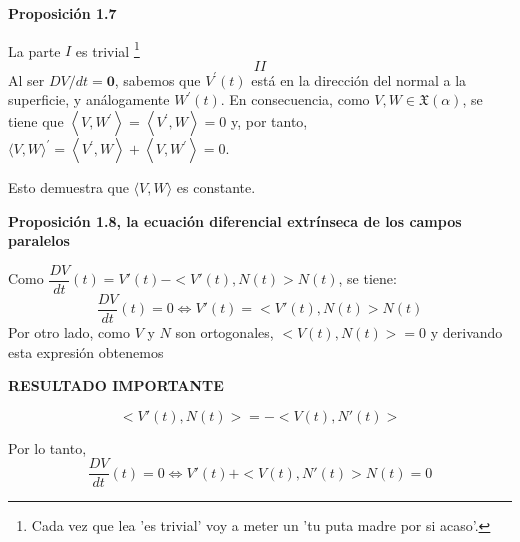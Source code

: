 \documentclass[openany]{book}
\begin{document}
\begin{center}
\textbf{Proposición 1.7}
\end{center}
\begin{demonstration}
  La parte $I$ es trivial \footnote{Cada vez que lea 'es trivial' voy a meter un 'tu puta madre por si acaso'.}
    $$ II $$
  Al ser $D V / d t=\mathbf{0}$, sabemos que $V^{\prime}(t)$ está en la dirección del normal a la superficie, y análogamente $W^{\prime}(t)$. En consecuencia, como $V, W \in \mathfrak{X}(\alpha)$, se tiene que $\left\langle V, W^{\prime}\right\rangle=\left\langle V^{\prime}, W\right\rangle=0$ y, por tanto, $\langle V, W\rangle^{\prime}=\left\langle V^{\prime}, W\right\rangle+\left\langle V, W^{\prime}\right\rangle=0$.

  Esto demuestra que $\langle V, W\rangle$ es constante.
\end{demonstration}
\newpage
\begin{center}
\textbf{Proposición 1.8, la ecuación diferencial extrínseca de los campos paralelos}
\end{center}
\begin{demonstration}
  Como $ \dfrac{DV}{dt}(t) = V'(t) - <V'(t), N(t)>N(t) $, se tiene:
  $$ \dfrac{DV}{dt}(t) = 0 \iff V'(t) = <V'(t), N(t)>N(t)  $$
  Por otro lado, como $V$ y $N$ son ortogonales, $<V(t), N(t)>=0$ y derivando esta expresión obtenemos
\begin{center}
  \textbf{\color{red} RESULTADO IMPORTANTE}
\end{center}
  $$ <V'(t), N(t)> = -<V(t), N'(t)>  $$

Por lo tanto,
$$ \dfrac{DV}{dt}(t) = 0 \iff V'(t) + <V(t), N'(t)>N(t)=0 $$
\end{demonstration}
\end{document}
